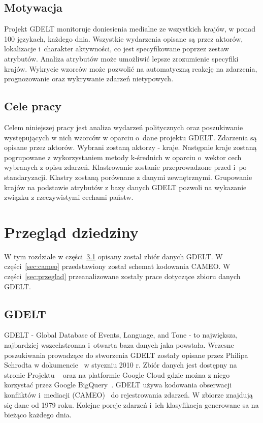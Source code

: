 \documentclass[11pt]{report}
\begin{document}
    \section{Motywacja}\label{sec:motywacja}
    Projekt GDELT monitoruje doniesienia medialne ze wszystkich krajów, w ponad 100 językach, każdego dnia.
    Wszystkie wydarzenia opisane są przez aktorów, lokalizacje i~charakter aktywności, co jest specyfikowane poprzez zestaw atrybutów.
    Analiza atrybutów może umożliwić lepsze zrozumienie specyfiki krajów.
    Wykrycie wzorców może pozwolić na automatyczną reakcję na zdarzenia, prognozowanie oraz wykrywanie zdarzeń nietypowych.


    \section{Cele pracy}\label{sec:cele-pracy}
    Celem niniejszej pracy jest analiza wydarzeń politycznych oraz poszukiwanie występujących w nich wzorców w oparciu o~dane projektu GDELT.
    Zdarzenia są opisane przez aktorów.
    Wybrani zostaną aktorzy - kraje.
    Następnie kraje zostaną pogrupowane z wykorzystaniem metody k-średnich w oparciu o~wektor cech wybranych z opisu zdarzeń.
    Klastrowanie zostanie przeprowadzone przed i~po standaryzacji.
    Klastry zostaną porównane z danymi zewnętrznymi.
    Grupowanie krajów na podstawie atrybutów z bazy danych GDELT pozwoli na wykazanie związku z rzeczywistymi cechami państw.


    \chapter{Przegląd dziedziny}\label{ch:przegląd-dziedziny}
    W tym rozdziale w części~\ref{sec:gdelt} opisany został zbiór danych GDELT.
    W części~\ref{sec:cameo} przedstawiony został schemat kodowania CAMEO.
    W części~\ref{sec:przeglad} przeanalizowane zostały prace dotyczące zbioru danych GDELT.


    \section{GDELT}\label{sec:gdelt}
    GDELT - Global Database of Events, Language, and Tone - to największa, najbardziej wszechstronna i~otwarta baza danych jaka powstała.
    Wczesne poszukiwania prowadzące do stworzenia GDELT zostały opisane przez Philipa Schrodta w dokumencie~\cite{Schrodt2010} w styczniu 2010 r.
    Zbiór danych jest dostępny na stronie Projektu ~\cite{gdelt} oraz na platformie Google Cloud gdzie można z niego korzystać przez Google BigQuery~\cite{BigQuery2014}.
    GDELT używa kodowania obserwacji konfliktów i~mediacji (CAMEO)~\cite{GDELTDocumentation} do rejestrowania zdarzeń.
    W zbiorze znajdują się dane od 1979 roku.
    Kolejne porcje zdarzeń i~ich klasyfikacja generowane sa na bieżąco każdego dnia.
\end{document}

